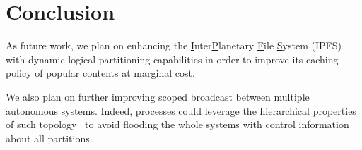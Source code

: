 
\section{Conclusion}
\label{sec:conclusion}

As future work, we plan on enhancing the
\underline{I}nter\underline{P}lanetary \underline{F}ile
\underline{S}ystem (IPFS)~\cite{henningsen2020mapping} with dynamic
logical partitioning capabilities in order to improve its caching
policy of popular contents at marginal cost.

\noindent We also plan on further improving scoped broadcast between
multiple autonomous systems. Indeed, processes could leverage the
hierarchical properties of such topology~\cite{nur2018geography} to
avoid flooding the whole systems with control information about all
partitions.

